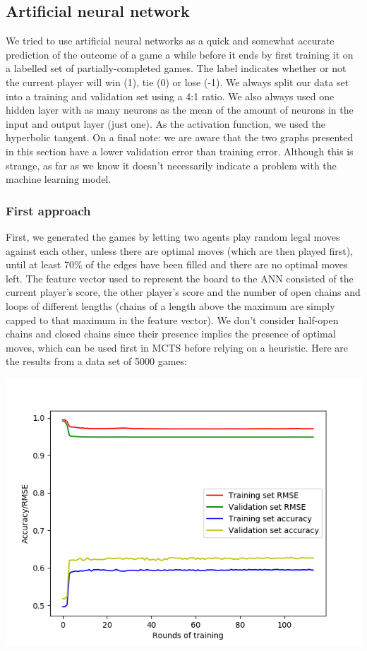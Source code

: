 \subsection{Artificial neural network}

We tried to use artificial neural networks as a quick and somewhat accurate prediction of the outcome of a game a while before it ends by first training it on a labelled set of partially-completed games. The label indicates whether or not the current player will win (1), tie (0) or lose (-1). We always split our data set into a training and validation set using a 4:1 ratio. We also always used one hidden layer with as many neurons as the mean of the amount of neurons in the input and output layer (just one). As the activation function, we used the hyperbolic tangent. On a final note: we are aware that the two graphs presented in this section have a lower validation error than training error. Although this is strange, as far as we know it doesn't necessarily indicate a problem with the machine learning model.

\subsubsection{First approach}

First, we generated the games by letting two agents play random legal moves against each other, unless there are optimal moves (which are then played first), until at least 70\% of the edges have been filled and there are no optimal moves left. The feature vector used to represent the board to the ANN consisted of the current player's score, the other player's score and the number of open chains and loops of different lengths (chains of a length above the maximum are simply capped to that maximum in the feature vector). We don't consider half-open chains and closed chains since their presence implies the presence of optimal moves, which can be used first in MCTS before relying on a heuristic. Here are the results from a data set of 5000 games:

\begin{center}
\includegraphics[scale=0.65]{images/ann_rmse+accuracy_(5000_games).png}
\end{center}

